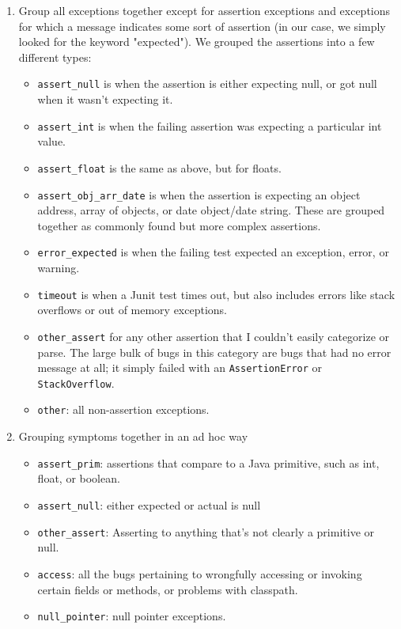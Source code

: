 \begin{enumerate}
	\item Group all exceptions together except for assertion exceptions and exceptions for which a message indicates some sort of assertion (in our case, we simply looked for the keyword "expected"). We grouped the assertions into a few different types: 
	\begin{itemize}
		\item \lstinline{assert_null} is when the assertion is either expecting null, or got null when it wasn't expecting it.
		\item \lstinline{assert_int} is when the failing assertion was expecting a particular int value.
		\item \lstinline{assert_float} is the same as above, but for floats.
		\item \lstinline{assert_obj_arr_date} is when the assertion is expecting an object address, array of objects, or date object/date string. These are grouped together as commonly found but more complex assertions.
		\item \lstinline{error_expected} is when the failing test expected an exception, error, or warning.
		\item \lstinline{timeout} is when a Junit test times out, but also includes errors like stack overflows or out of memory exceptions.
		\item \lstinline{other_assert} for any other assertion that I couldn't easily categorize or parse. The large bulk of bugs in this category are bugs that had no error message at all; it simply failed with an \lstinline{AssertionError} or \lstinline{StackOverflow}.
		\item \lstinline{other}: all non-assertion exceptions.
	\end{itemize}
	\item Grouping symptoms together in an ad hoc way 
	\begin{itemize}
		\item \lstinline{assert_prim}: assertions that compare to a Java primitive, such as int, float, or boolean.
		\item \lstinline{assert_null}: either expected or actual is null
		\item \lstinline{other_assert}: Asserting to anything that's not clearly a primitive or null.
		\item \lstinline{access}: all the bugs pertaining to wrongfully accessing or invoking certain fields or methods, or problems with classpath.
		\item \lstinline{null_pointer}: null pointer exceptions.

\end{itemize}
\end{enumerate}
